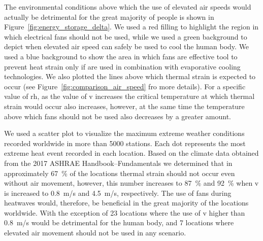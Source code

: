 The environmental conditions above which the use of elevated air speeds would actually be detrimental for the great majority of people is shown in Figure~\ref{fig:energy_storage_delta}.
We used a red filling to highlight the region in which electrical fans should not be used, while we used a green background to depict when elevated air speed can safely be used to cool the human body.
We used a blue background to show the area in which fans are effective tool to prevent heat strain only if are used in combination with evaporative cooling technologies.
We also plotted the lines above which thermal strain is expected to occur (see Figure~\ref{fig:comparison_air_speed} fro more details).
For a specific value of \ac{rh}, as the value of \ac{v} increases the critical temperature at which thermal strain would occur also increases, however, at the same time the temperature above which fans should not be used also decreases by a greater amount.

We used a scatter plot to visualize the maximum extreme weather conditions recorded worldwide in more than 5000 stations.
Each dot represents the most extreme heat event recorded in each location.
Based on the climate data obtained from the 2017 ASHRAE Handbook--Fundamentals we determined that in approximately 67~\% of the locations thermal strain should not occur even without air movement, however, this number increases to 87~\% and 92~\% when \ac{v} is increased to 0.8~m/s and 4.5~m/s, respectively.
The use of fans during heatwaves would, therefore, be beneficial in the great majority of the locations worldwide.
With the exception of 23 locations where the use of \ac{v} higher than 0.8~m/s would be detrimental for the human body, and 7 locations where elevated air movement should not be used in any scenario.



